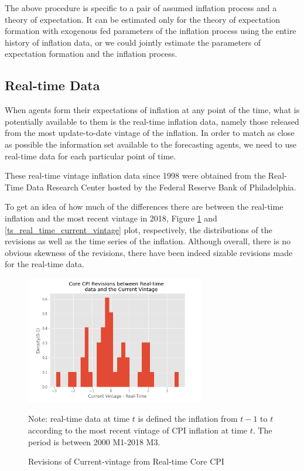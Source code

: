 \documentclass[]{article}
\begin{document}
The above procedure is specific to a pair of assumed inflation process and a theory of expectation. It can be estimated only for the theory of expectation formation with exogenous fed parameters of the inflation process using the entire history of inflation data, or we could jointly estimate the parameters of expectation formation and the inflation process. 


\subsection{Real-time Data}

When agents form their expectations of inflation at any point of the time, what is potentially available to them is the real-time inflation data, namely those released from the most update-to-date vintage of the inflation. In order to match as close as possible the information set available to the forecasting agents, we need to use real-time data for each particular point of time.  

These real-time vintage inflation data since 1998 were obtained from the Real-Time Data Research Center hosted by the Federal Reserve Bank of Philadelphia. 

To get an idea of how much of the differences there are between the real-time inflation and the most recent vintage in 2018, Figure \ref{real_time_rev} and \ref{ts_real_time_current_vintage} plot, respectively, the distributions of the revisions as well as the time series of the inflation. Although overall, there is no obvious skewness of the revisions, there have been indeed sizable revisions made for the real-time data. 

\begin{figure}[htbp]
		\centering
\includegraphics[width=0.7\textwidth]{figures/hist_rev_realtime.png}
\caption{Revisions of Current-vintage from Real-time Core CPI}
\label{real_time_rev}
	\begin{flushleft}
	{\footnotesize Note: real-time data  at time $t$ is defined the inflation from $t-1$ to $t$ according to the most recent vintage of CPI inflation at time $t$. The period is between 2000 M1-2018 M3.}
\end{flushleft}
\end{figure}
\end{document}
